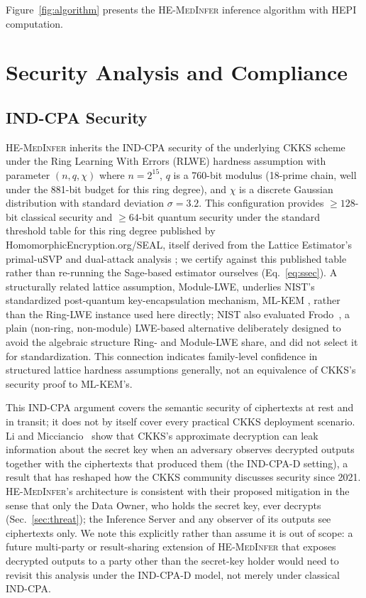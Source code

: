 \documentclass[journal,compsoc]{IEEEtran}
\newcommand{\HEPI}{\textsc{HEPI}}          %
\newcommand{\framework}{\textsc{HE-MedInfer}}
\begin{document}
Figure~\ref{fig:algorithm} presents the \framework{} inference algorithm with
\HEPI{} computation.



\section{Security Analysis and Compliance}
\label{sec:security}

\subsection{IND-CPA Security}

\framework{} inherits the IND-CPA security of the underlying CKKS scheme
under the Ring Learning With Errors (RLWE) hardness assumption
\cite{peikert2016decade} with parameter $(n, q, \chi)$ where $n = 2^{15}$,
$q$ is a 760-bit modulus (18-prime chain, well under the 881-bit budget for
this ring degree), and $\chi$ is a discrete Gaussian distribution with
standard deviation $\sigma = 3.2$.
This configuration provides $\geq 128$-bit classical security and $\geq 64$-bit
quantum security under the standard threshold table for this ring degree
published by HomomorphicEncryption.org/SEAL, itself derived from the Lattice
Estimator's primal-uSVP and dual-attack analysis \cite{albrecht2015concrete};
we certify against this published table rather than re-running the
Sage-based estimator ourselves (Eq.~\ref{eq:ssec}).
A structurally related lattice assumption, Module-LWE, underlies NIST's
standardized post-quantum key-encapsulation mechanism, ML-KEM
\cite{nist2024pqc}, rather than the Ring-LWE instance used here directly;
NIST also evaluated Frodo~\cite{bos2017frodo}, a plain (non-ring, non-module)
LWE-based alternative deliberately designed to avoid the algebraic structure
Ring- and Module-LWE share, and did not select it for standardization. This
connection indicates family-level confidence in structured lattice hardness
assumptions generally, not an equivalence of CKKS's security proof to
ML-KEM's.

This IND-CPA argument covers the semantic security of ciphertexts at rest
and in transit; it does not by itself cover every practical CKKS deployment
scenario. Li and Micciancio~\cite{li2021security} show that CKKS's
approximate decryption can leak information about the secret key when an
adversary observes decrypted outputs together with the ciphertexts that
produced them (the IND-CPA-D setting), a result that has reshaped how the
CKKS community discusses security since 2021. \framework{}'s architecture is
consistent with their proposed mitigation in the sense that only the Data
Owner, who holds the secret key, ever decrypts (Sec.~\ref{sec:threat}); the
Inference Server and any observer of its outputs see ciphertexts only. We
note this explicitly rather than assume it is out of scope: a future
multi-party or result-sharing extension of \framework{} that exposes
decrypted outputs to a party other than the secret-key holder would need to
revisit this analysis under the IND-CPA-D model, not merely under classical
IND-CPA.
\end{document}

